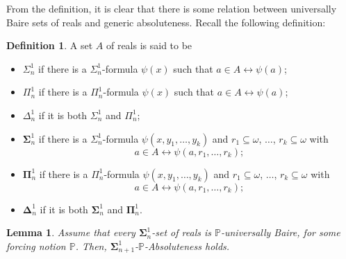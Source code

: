\documentclass[10pt]{amsart}
\newtheorem{lemma}[theorem]{Lemma}
\theoremstyle{definition}
\newtheorem{definition}[theorem]{Definition}
\begin{document}
From the definition, it is clear that there is some relation between universally Baire sets of reals and generic absoluteness. Recall the following definition:

\begin{definition}
    A set $A$ of reals is said to be
    \begin{itemize}
        \item $\Sigma^1_n$ if there is a $\Sigma^1_n$-formula $\psi(x)$ such that $a\in A\leftrightarrow \psi(a)$;
        \item $\Pi^1_n$ if there is a $\Pi^1_n$-formula $\psi(x)$ such that $a\in A\leftrightarrow \psi(a)$;
        \item $\Delta^1_n$ if it is both $\Sigma^1_n$ and $\Pi^1_n$;
        \item $\boldsymbol\Sigma^1_n$ if there is a $\Sigma^1_n$-formula $\psi(x,y_1,\ldots,y_k)$ and $r_1\subseteq\omega$, $\ldots$, $r_k\subseteq\omega$ with
        \[a\in A\leftrightarrow \psi(a,r_1,\ldots,r_k);\]
        \item $\boldsymbol\Pi^1_n$ if there is a $\Pi^1_n$-formula $\psi(x,y_1,\ldots,y_k)$ and $r_1\subseteq\omega$, $\ldots$, $r_k\subseteq\omega$ with
        \[a\in A\leftrightarrow \psi(a,r_1,\ldots,r_k);\]
        \item $\boldsymbol\Delta^1_n$ if it is both $\boldsymbol\Sigma^1_n$ and $\boldsymbol\Pi^1_n$.
    \end{itemize}
\end{definition}

\begin{lemma}\label{uBabs}
    Assume that every $\boldsymbol\Sigma^1_n$-set of reals is $\mathbb P$-universally Baire, for some forcing notion $\mathbb P$. Then, $\boldsymbol\Sigma^1_{n+1}$-$\mathbb P$-Absoluteness holds.
\end{lemma}
\end{document}
